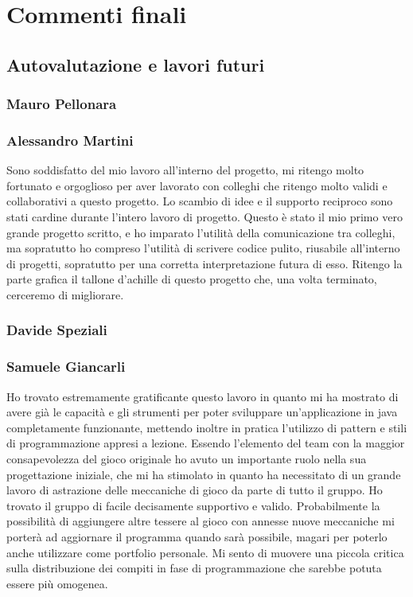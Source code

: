 \section{Commenti finali}
\subsection{Autovalutazione e lavori futuri}
\subsubsection*{Mauro Pellonara} 

\subsubsection*{Alessandro Martini}
Sono soddisfatto del mio lavoro all'interno del progetto, mi ritengo molto fortunato e orgoglioso per aver lavorato con colleghi che ritengo molto validi e collaborativi a questo progetto.
Lo scambio di idee e il supporto reciproco sono stati cardine durante l'intero lavoro di progetto. Questo è stato il mio primo vero grande progetto scritto, e ho imparato l'utilità della comunicazione tra colleghi, ma sopratutto ho compreso l'utilità di scrivere codice pulito, riusabile all'interno di progetti, sopratutto per una corretta interpretazione futura di esso. Ritengo la parte grafica il tallone d'achille di questo progetto che, una volta terminato, cerceremo di migliorare.
\subsubsection*{Davide Speziali}

\subsubsection*{Samuele Giancarli}
Ho trovato estremamente gratificante questo lavoro in quanto mi ha mostrato di avere già le capacità e gli strumenti per poter sviluppare un'applicazione in java completamente funzionante, mettendo inoltre in pratica l'utilizzo di pattern e stili di programmazione appresi a lezione. Essendo l'elemento del team con la maggior consapevolezza del gioco originale ho avuto un importante ruolo nella sua progettazione iniziale, che mi ha stimolato in quanto ha necessitato di un grande lavoro di astrazione delle meccaniche di gioco da parte di tutto il gruppo. Ho trovato il gruppo di facile  decisamente supportivo e valido. Probabilmente la possibilità di aggiungere altre tessere al gioco con annesse nuove meccaniche mi porterà ad aggiornare il programma quando sarà possibile, magari per poterlo anche utilizzare come portfolio personale. Mi sento di muovere una piccola critica sulla distribuzione dei compiti in fase di programmazione che sarebbe potuta essere più omogenea.

